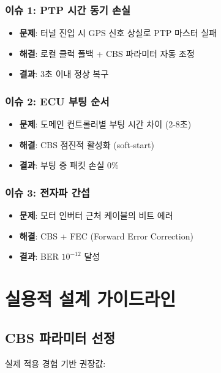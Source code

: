 \documentclass[twocolumn,10pt]{article}
\begin{document}
\subsubsection{이슈 1: PTP 시간 동기 손실}
\begin{itemize}
    \item \textbf{문제}: 터널 진입 시 GPS 신호 상실로 PTP 마스터 실패
    \item \textbf{해결}: 로컬 클럭 폴백 + CBS 파라미터 자동 조정
    \item \textbf{결과}: 3초 이내 정상 복구
\end{itemize}

\subsubsection{이슈 2: ECU 부팅 순서}
\begin{itemize}
    \item \textbf{문제}: 도메인 컨트롤러별 부팅 시간 차이 (2-8초)
    \item \textbf{해결}: CBS 점진적 활성화 (soft-start)
    \item \textbf{결과}: 부팅 중 패킷 손실 0\%
\end{itemize}

\subsubsection{이슈 3: 전자파 간섭}
\begin{itemize}
    \item \textbf{문제}: 모터 인버터 근처 케이블의 비트 에러
    \item \textbf{해결}: CBS + FEC (Forward Error Correction)
    \item \textbf{결과}: BER $10^{-12}$ 달성
\end{itemize}

\section{실용적 설계 가이드라인}
\label{sec:guidelines}

\subsection{CBS 파라미터 선정}

실제 적용 경험 기반 권장값:
\end{document}
